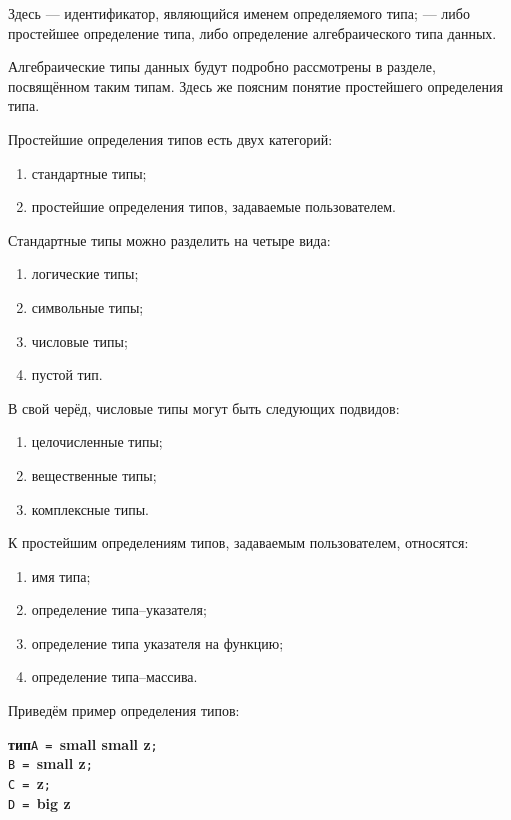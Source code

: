 \documentclass[10pt]{report}
\begin{document}
Здесь \textcolor{Green}{} --- идентификатор, являющийся именем определяемого типа; \textcolor{Green}{} --- либо
простейшее определение типа, либо определение алгебраического типа данных.

Алгебраические типы данных будут подробно рассмотрены в разделе, посвящённом таким типам. Здесь же поясним понятие простейшего определения типа.

Простейшие определения типов есть двух категорий:
\begin{enumerate}
    \item стандартные типы;
    \item простейшие определения типов, задаваемые пользователем.
\end{enumerate}

Стандартные типы можно разделить на четыре вида:
\begin{enumerate}
    \item логические типы;
    \item символьные типы;
    \item числовые типы;
    \item пустой тип.
\end{enumerate}

В свой черёд, числовые типы могут быть следующих подвидов:
\begin{enumerate}
    \item целочисленные типы;
    \item вещественные типы;
    \item комплексные типы.
\end{enumerate}

К простейшим определениям типов, задаваемым пользователем, относятся:
\begin{enumerate}
    \item имя типа;
    \item определение типа--указателя;
    \item определение типа указателя на функцию;
    \item определение типа--массива.
\end{enumerate}

Приведём пример определения типов:

\noindent\textbf{тип}\phantom{m}\texttt{A = }\textbf{small small z}\texttt{;}\\
\phantom{типm}\texttt{B = }\textbf{small z}\texttt{;}\\
\phantom{типm}\texttt{C = }\textbf{z}\texttt{;}\\
\phantom{типm}\texttt{D = }\textbf{big z }
\end{document}
